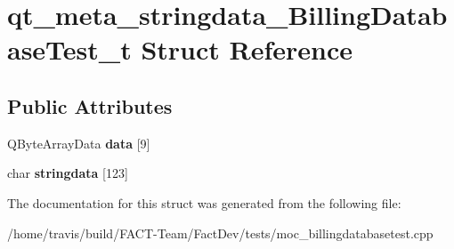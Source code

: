 \hypertarget{structqt__meta__stringdata__BillingDatabaseTest__t}{\section{qt\-\_\-meta\-\_\-stringdata\-\_\-\-Billing\-Database\-Test\-\_\-t Struct Reference}
\label{structqt__meta__stringdata__BillingDatabaseTest__t}
}
\subsection*{Public Attributes}
\begin{DoxyCompactItemize}
\item 
\hypertarget{structqt__meta__stringdata__BillingDatabaseTest__t_aa2a19f3d42957e2a699798ebad1ac99a}{Q\-Byte\-Array\-Data {\bfseries data} \mbox{[}9\mbox{]}}\label{structqt__meta__stringdata__BillingDatabaseTest__t_aa2a19f3d42957e2a699798ebad1ac99a}

\item 
\hypertarget{structqt__meta__stringdata__BillingDatabaseTest__t_ac6c36dadd222f929f5aca98757b2760a}{char {\bfseries stringdata} \mbox{[}123\mbox{]}}\label{structqt__meta__stringdata__BillingDatabaseTest__t_ac6c36dadd222f929f5aca98757b2760a}

\end{DoxyCompactItemize}


The documentation for this struct was generated from the following file\-:\begin{DoxyCompactItemize}
\item 
/home/travis/build/\-F\-A\-C\-T-\/\-Team/\-Fact\-Dev/tests/moc\-\_\-billingdatabasetest.\-cpp\end{DoxyCompactItemize}
